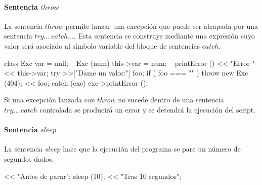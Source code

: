 

\paragraph{Sentencia $throw$} \label{sec:stmt_throw}

La sentencia $throw$ permite lanzar una excepción que puede ser atrapada por una 
sentencia $try...\ catch...$. Esta sentencia se construye mediante una expresión cuyo 
valor será asociado al símbolo variable del bloque de sentencias $catch$. \\

\begin{myverbatim}
   class Exc {
      var = null;
      ~ Exc (num) {
         this->var = num;
      }
      ~ printError () {
         << "Error " << this->var;
      }
   }
   try {
      >>["Dame un valor:"] foo;
      if ( foo === "" ){
         throw new Exc (404);
      } 
      << foo;
   }catch (exc) {
      exc->printError ();
   }
\end{myverbatim}

Si una excepción lanzada con $throw$ no sucede dentro de una sentencia $try...\ catch$ controlada
se producirá un error y se detendrá la ejecución del script.


\paragraph{Sentencia $sleep$} \label{sec:stmt_sleep}

La sentencia $sleep$ hace que la ejecución del programa se pare un número de segundos dados. \\

\begin{myverbatim}
   << "Antes de parar";
   sleep (10);
   << "Tras 10 segundos";
\end{myverbatim}


